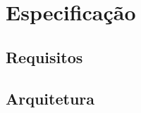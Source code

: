 \section{Especificação}


\subsection{Requisitos}
    \begin{frame}\frametitle{}
    \end{frame}
    
\subsection{Arquitetura}
    \begin{frame}\frametitle{}
    \end{frame}
    
